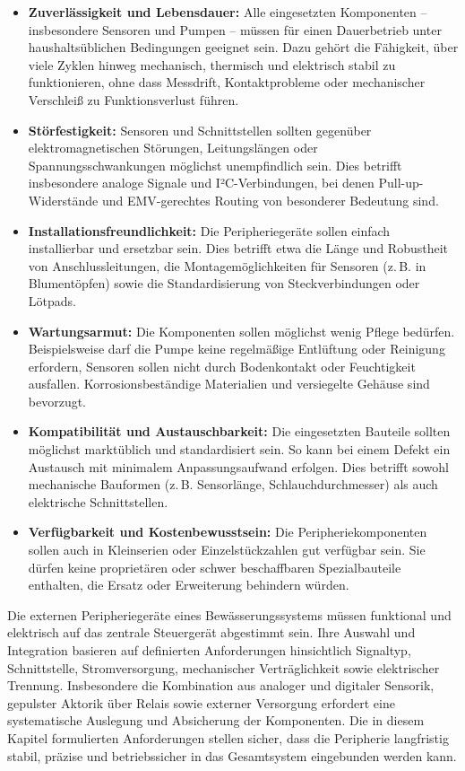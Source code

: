 \begin{itemize}
	\item \textbf{Zuverlässigkeit und Lebensdauer:} Alle eingesetzten Komponenten – insbesondere Sensoren und Pumpen – müssen für einen Dauerbetrieb unter haushaltsüblichen Bedingungen geeignet sein. Dazu gehört die Fähigkeit, über viele Zyklen hinweg mechanisch, thermisch und elektrisch stabil zu funktionieren, ohne dass Messdrift, Kontaktprobleme oder mechanischer Verschleiß zu Funktionsverlust führen.
	
	\item \textbf{Störfestigkeit:} Sensoren und Schnittstellen sollten gegenüber elektromagnetischen Störungen, Leitungslängen oder Spannungsschwankungen möglichst unempfindlich sein. Dies betrifft insbesondere analoge Signale und I²C-Verbindungen, bei denen Pull-up-Widerstände und EMV-gerechtes Routing von besonderer Bedeutung sind.
	
	\item \textbf{Installationsfreundlichkeit:} Die Peripheriegeräte sollen einfach installierbar und ersetzbar sein. Dies betrifft etwa die Länge und Robustheit von Anschlussleitungen, die Montagemöglichkeiten für Sensoren (z.\,B. in Blumentöpfen) sowie die Standardisierung von Steckverbindungen oder Lötpads.
	
	\item \textbf{Wartungsarmut:} Die Komponenten sollen möglichst wenig Pflege bedürfen. Beispielsweise darf die Pumpe keine regelmäßige Entlüftung oder Reinigung erfordern, Sensoren sollen nicht durch Bodenkontakt oder Feuchtigkeit ausfallen. Korrosionsbeständige Materialien und versiegelte Gehäuse sind bevorzugt.
	
	\item \textbf{Kompatibilität und Austauschbarkeit:} Die eingesetzten Bauteile sollten möglichst marktüblich und standardisiert sein. So kann bei einem Defekt ein Austausch mit minimalem Anpassungsaufwand erfolgen. Dies betrifft sowohl mechanische Bauformen (z.\,B. Sensorlänge, Schlauchdurchmesser) als auch elektrische Schnittstellen.
	
	\item \textbf{Verfügbarkeit und Kostenbewusstsein:} Die Peripheriekomponenten sollen auch in Kleinserien oder Einzelstückzahlen gut verfügbar sein. Sie dürfen keine proprietären oder schwer beschaffbaren Spezialbauteile enthalten, die Ersatz oder Erweiterung behindern würden.
\end{itemize}

\vspace{1em}
\noindent Die externen Peripheriegeräte eines Bewässerungssystems müssen funktional und elektrisch auf das zentrale Steuergerät abgestimmt sein. Ihre Auswahl und Integration basieren auf definierten Anforderungen hinsichtlich Signaltyp, Schnittstelle, Stromversorgung, mechanischer Verträglichkeit sowie elektrischer Trennung. Insbesondere die Kombination aus analoger und digitaler Sensorik, gepulster Aktorik über Relais sowie externer Versorgung erfordert eine systematische Auslegung und Absicherung der Komponenten. Die in diesem Kapitel formulierten Anforderungen stellen sicher, dass die Peripherie langfristig stabil, präzise und betriebssicher in das Gesamtsystem eingebunden werden kann.
